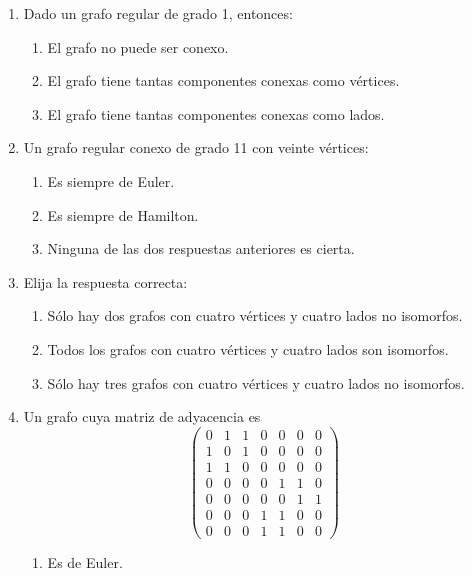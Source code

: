 \begin{ejercicio}
\begin{enumerate}
\begin{enumerate}
        \end{enumerate}
        \item Dado un grafo regular de grado 1, entonces:
        \begin{enumerate}
            \item El grafo no puede ser conexo.
            \item El grafo tiene tantas componentes conexas como vértices.
            \item El grafo tiene tantas componentes conexas como lados.
        \end{enumerate}
        \item Un grafo regular conexo de grado 11 con veinte vértices:
        \begin{enumerate}
            \item Es siempre de Euler.
            \item Es siempre de Hamilton.
            \item Ninguna de las dos respuestas anteriores es cierta.
        \end{enumerate}
        \item Elija la respuesta correcta:
        \begin{enumerate}
            \item Sólo hay dos grafos con cuatro vértices y cuatro lados no isomorfos.
            \item Todos los grafos con cuatro vértices y cuatro lados son isomorfos.
            \item Sólo hay tres grafos con cuatro vértices y cuatro lados no isomorfos.
        \end{enumerate}
        \item Un grafo cuya matriz de adyacencia es
        \[
            \begin{pmatrix}
                0 & 1 & 1 & 0 & 0 & 0 & 0 \\
                1 & 0 & 1 & 0 & 0 & 0 & 0 \\
                1 & 1 & 0 & 0 & 0 & 0 & 0 \\
                0 & 0 & 0 & 0 & 1 & 1 & 0 \\
                0 & 0 & 0 & 0 & 0 & 1 & 1 \\
                0 & 0 & 0 & 1 & 1 & 0 & 0 \\
                0 & 0 & 0 & 1 & 1 & 0 & 0
            \end{pmatrix}
        \]
        \begin{enumerate}
            \item Es de Euler.

\end{enumerate}
\end{enumerate}
\end{ejercicio}
